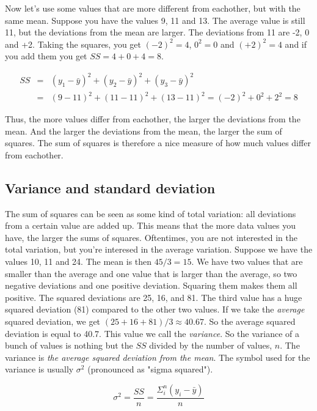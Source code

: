 \documentclass[]{report}\usepackage[]{graphicx}\usepackage[]{color}
\begin{document}
Now let's use some values that are more different from eachother, but with the same mean. Suppose you have the values 9, 11 and 13. The average value is still 11, but the deviations from the mean are larger. The deviations from 11 are -2, 0 and +2. Taking the squares, you get $(-2)^2=4$, $0^2=0$ and $(+2)^2=4$ and if you add them you get $SS=4+0+4=8$.

\begin{eqnarray}
SS &=& (y_1-\bar{y})^2 + (y_2-\bar{y})^2 +(y_3-\bar{y})^2 \\
&=& (9-11)^2 + (11-11)^2 +(13-11)^2= (-2)^2 + 0^2 + 2^2=8 \nonumber
\end{eqnarray}

Thus, the more values differ from eachother, the larger the deviations from the mean. And the larger the deviations from the mean, the larger the sum of squares. The sum of squares is therefore a nice measure of how much values differ from eachother.

\subsection{Variance and standard deviation} \label{sec:standarddeviation}

The sum of squares can be seen as some kind of total variation: all deviations from a certain value are added up. This means that the more data values you have, the larger the sums of squares. Oftentimes, you are not interested in the total variation, but you're interesed in the average variation. Suppose we have the values 10, 11 and 24. The mean is then $45/3=15$. We have two values that are smaller than the average and one value that is larger than the average, so two negative deviations and one positive deviation. Squaring them makes them all positive. The squared deviations are 25, 16, and 81. The third value has a huge squared deviation (81) compared to the other two values. If we take the \textit{average} squared deviation, we get $(25+16+81)/3 \approx 40.67$. So the average squared deviation is equal to 40.7. This value we call the \textit{variance}. So the variance of a bunch of values is nothing but the $SS$ divided by the number of values, $n$. The variance is \textit{the average squared deviation from the mean}. The symbol used for the variance is usually $\sigma^2$ (pronounced as "sigma squared").

\begin{equation}
\sigma^2 = \frac{SS}{n}= \frac{\Sigma_i^n (y_i-\bar{y})}{n}
\end{equation}
\end{document}
